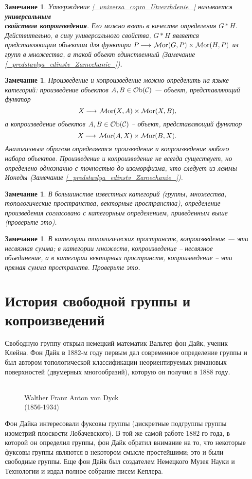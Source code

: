\documentclass[12pt]{book}
\newcommand{\arrow}{{\:\longrightarrow\:}}
\newcommand{\Ob}{\operatorname{{\cal O}b}}
\newcommand{\Mor}{\operatorname{{\cal M}or}}
\newcommand{\cac}{{\cal C}}
\theoremstyle{upshape}
\newtheorem{zadacha}{Задача}[chapter]
\theoremstyle{generic}
\newtheorem{remark}[teorema]{Замечание}
\def\замечание{\begin{remark}}
\def\еза{\end{remark}}
\theoremstyle{upshapenonumber}
\newcommand{\следствие}{%
     \refstepcounter{teorema}
     {\noindent\bf Следствие \thechapter.\arabic{teorema}:\ }}
\newcommand{\пример}{%
     \refstepcounter{teorema}
     {\noindent\bf Пример \thechapter.\arabic{teorema}:\ }}
\newcommand{\лемма}{%
     \refstepcounter{teorema}
     {\noindent\bf Лемма \thechapter.\arabic{teorema}:\ }}
\newcommand{\теорема}{%
     \refstepcounter{teorema}
     {\noindent\bf Теорема \thechapter.\arabic{teorema}:\ }}
\newcommand{\утверждение}{%
     \refstepcounter{teorema}
     {\noindent\bf Утверждение \thechapter.\arabic{teorema}:\ }}
\def\бф{\bf}
\def\ем{\em}
\def\задача{\begin{zadacha}}
\def\ез{\end{zadacha}}
\def\еу{\end{ukazanie}}
\def\ео{\end{opredelenie}}
\def\енум{\begin{enumerate}}
\def\ее{\end{enumerate}}
\begin{document}
\замечание
Утверждение \ref{_universa_copro_Utverzhdenie_}
называется {\бф универсальным \\свойством копроизведения}. 
Его можно взять в качестве определения $G*H$. Действительно,
в силу универсального свойства,
$G*H$ является представляющим объектом для 
функтора $P \arrow \Mor(G,P)\times \Mor(H,P)$
из групп в множества, а такой объект единственный
(Замечание \ref{_predstavlya_edinstv_Zamechanie_}).
\еза

\замечание
Произведение
и копроизведение можно определить на языке категорий:
произведение объектов $A, B \in \Ob(\cac)$ --- объект,
представляющий функтор \[ X \arrow \Mor(X,A) \times \Mor(X,B),\]
а копроизведение объектов $A, B \in \Ob(\cac)$ --
объект, представляющий функтор \[ X\arrow \Mor(A,X) \times \Mor(B,X).\]
Аналогичным образом определяется произведение и
копроизведение любого набора объектов. Произведение
и копроизведение не всегда существует, но определено
однозначно с точностью до изоморфизма, что следует 
из леммы Ионеды (Замечание \ref{_predstavlya_edinstv_Zamechanie_}).
\еза

\замечание
В большинстве известных категорий (группы, множества,
топологические пространства, векторные пространства), 
определение произведения согласовано с категорным 
определением, приведенным выше (проверьте это).
\еза

\замечание
В категории топологических пространств,
копроизведение --- это несвязная сумма;
в категории множеств, копроизведение --
несвязное объединение, а в категории
векторных пространств, копроизведение --
это прямая сумма пространств. Проверьте это.
\еза


\section{История свободной группы и копроизведений}


Свободную группу открыл немецкий математик Вальтер 
фон Дайк, ученик Клейна.
Фон Дайк в 1882-м году первым дал современное определение группы
и был автором топологической классификации неориентируемых римановых
поверхностей (двумерных многообразий), которую он получил
в 1888 году. 


\begin{figure}[ht]
\begin{center}
\\
{Walther Franz Anton von Dyck\\
(1856-1934)}
\end{center}
\end{figure}
Фон Дайка интересовали фуксовы группы (дискретные
подгруппы группы изометрий плоскости Лобачевского).
В той же самой работе 1882-го года, в которой он
определил группы, фон Дайк обратил внимание на 
то, что некоторые фуксовы группы являются 
в некотором смысле простейшими; это и были 
свободные группы. Еще фон Дайк был создателем 
Немецкого Музея Науки и Технологии
и издал полное собрание писем Кеплера.
\end{document}
